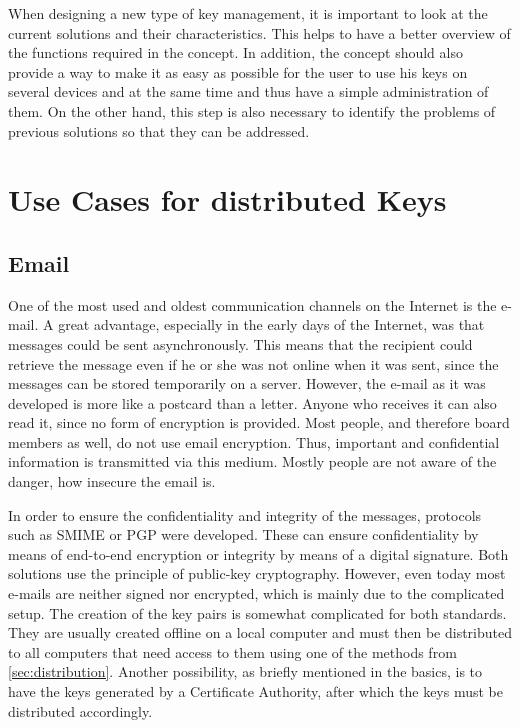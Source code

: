 \documentclass[12pt,oneside,a4paper,parskip]{scrbook}
\begin{document}
When designing a new type of key management, it is important to look at the current solutions and their characteristics. This helps to have a better overview of the functions required in the concept. In addition, the concept should also provide a way to make it as easy as possible for the user to use his keys on several devices and at the same time and thus have a simple administration of them. On the other hand, this step is also necessary to identify the problems of previous solutions so that they can be addressed.

\section{Use Cases for distributed Keys}

\subsection{Email}
One of the most used and oldest communication channels on the Internet is the e-mail. A great advantage, especially in the early days of the Internet, was that messages could be sent asynchronously. This means that the recipient could retrieve the message even if he or she was not online when it was sent, since the messages can be stored temporarily on a server. \parencite{van_vleck_electronic_2012} \newline
However, the e-mail as it was developed is more like a postcard than a letter. Anyone who receives it can also read it, since no form of encryption is provided. Most people, and therefore board members as well, do not use email encryption. Thus, important and confidential information is transmitted via this medium. Mostly people are not aware of the danger, how insecure the email is.  \parencite{managers_mail_2019} \newline

In order to ensure the confidentiality and integrity of the messages, protocols such as SMIME or PGP were developed. These can ensure confidentiality by means of end-to-end encryption or integrity by means of a digital signature. Both solutions use the principle of public-key cryptography. However, even today most e-mails are neither signed nor encrypted, which is mainly due to the complicated setup. The creation of the key pairs is somewhat complicated for both standards. They are usually created offline on a local computer and must then be distributed to all computers that need access to them using one of the methods from \ref{sec:distribution}. Another possibility, as briefly mentioned in the basics, is to have the keys generated by a Certificate Authority, after which the keys must be distributed accordingly. \parencite{kirsch_2001}
\end{document}
